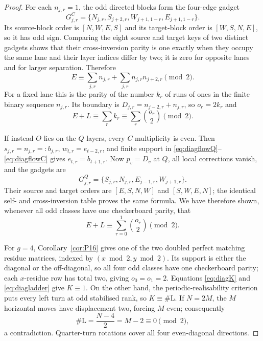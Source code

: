 \documentclass[11pt,letterpaper]{article}
\theoremstyle{plain}
\theoremstyle{definition}
\newcommand{\growth}{g}
\newcommand{\turnL}{\mathrm{L}}
\begin{document}
\begin{NoHyper}
\begin{proof}
For each $n_{j,r}=1$, the odd directed blocks form the four-edge gadget
\[
 G^C_{j,r}=\{N_{j,r},S_{j+2,r},W_{j+1,1-r},E_{j+1,1-r}\}.
\]
Its source-block order is $[N,W,E,S]$ and its target-block order is
$[W,S,N,E]$, so it has odd sign.  Comparing the eight source and target keys of
two distinct gadgets shows that their cross-inversion parity is one exactly when
they occupy the same lane and their layer indices differ by two; it is zero for
opposite lanes and for larger separation.  Therefore
\begin{equation}\label{eq:diagedgesign}
 E\equiv\sum_{j,r}n_{j,r}+\sum_{j,r}n_{j,r}n_{j+2,r}\pmod2.
\end{equation}
For a fixed lane this is the parity of the number $k_r$ of runs of ones in the
finite binary sequence $n_{j,r}$.  Its boundary is
$D_{j,r}=n_{j-2,r}+n_{j,r}$, so $o_r=2k_r$ and
\[
 E+L\equiv\sum_r k_r\equiv\sum_r\binom{o_r}{2}\pmod2.
\]

If instead $O$ lies on the $Q$ layers, every $C$ multiplicity is even.  Then
$s_{j,r}=n_{j,r}=:b_{j,r}$, $w_{t,r}=e_{t-2,r}$, and finite support in
\eqref{eq:diagflowQ}--\eqref{eq:diagflowC} gives $e_{t,r}=b_{t+1,r}$.
Now $p_v=D_v$ at $Q$, all local corrections vanish, and the gadgets are
\[
 G^Q_{j,r}=\{S_{j,r},N_{j,r},E_{j-1,r},W_{j+1,r}\}.
\]
Their source and target orders are $[E,S,N,W]$ and $[S,W,E,N]$; the identical
self- and cross-inversion table proves the same formula.  We have therefore shown,
whenever all odd classes have one checkerboard parity, that
\begin{equation}\label{eq:diagladder}
 E+L\equiv\sum_{r=0}^1\binom{o_r}{2}\pmod2.
\end{equation}

For $\growth=4$, Corollary~\ref{cor:P16} gives one of the two doubled perfect
matching residue matrices, indexed by $(x\bmod2,y\bmod2)$.  Its support is either
the diagonal or the off-diagonal, so all four odd classes have one checkerboard
parity; each $x$-residue row has total two, giving $o_0=o_1=2$.
Equations \eqref{eq:diagK} and \eqref{eq:diagladder} give
$K\equiv1$.  On the other hand, the periodic-realisability criterion puts every
left turn at odd stabilised rank, so $K\equiv\#\turnL$.  If $N=2M$, the $M$
horizontal moves have displacement two, forcing $M$ even; consequently
\[
 \#\turnL=\frac{N-4}{2}=M-2\equiv0\pmod2,
\]
a contradiction.  Quarter-turn rotations cover all four even-diagonal directions.
\end{proof}


\end{NoHyper}
\end{document}
